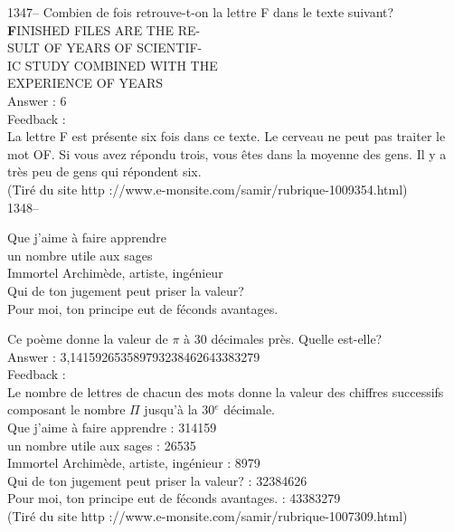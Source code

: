 ﻿\documentclass[letterpaper, 12pt]{article}
\begin{document}
1347-- Combien de fois retrouve-t-on la lettre F dans le texte suivant?\\

{\Large\textbf FINISHED FILES ARE THE RE-\\
SULT OF YEARS OF SCIENTIF-\\
IC STUDY COMBINED WITH THE \\
EXPERIENCE OF YEARS}\\


Answer : 6\\

Feedback : \\
La lettre F est pr\'esente six fois dans ce texte. Le cerveau ne
peut pas traiter le mot \og OF\fg .  Si vous avez r\'epondu trois,
vous \^etes dans la moyenne des gens.  Il y a tr\`es peu de gens qui r\'epondent six.  \\
(Tir\'e du site http ://www.e-monsite.com/samir/rubrique-1009354.html)\\

1348-- \begin{center}{Que j'aime \`a faire apprendre\\
un nombre utile aux sages\\
Immortel Archim\`ede, artiste, ing\'enieur\\
Qui de ton jugement peut priser la valeur?\\
Pour moi, ton principe eut de f\'econds avantages.\\}\end{center} Ce
po\`eme donne la valeur de $\pi$ \`a 30 d\'ecimales pr\`es. Quelle
est-elle?\\

Answer : 3,141592653589793238462643383279\\

Feedback : \\
Le nombre de lettres de chacun des mots donne la valeur des chiffres
successifs composant le nombre $\Pi$ jusqu'\`a la 30$^e$ d\'ecimale.\\

Que j'aime \`a faire apprendre : 314159\\
un nombre utile aux sages : 26535\\
Immortel Archim\`ede, artiste, ing\'enieur : 8979\\
Qui de ton jugement peut priser la valeur? : 32384626\\
Pour moi, ton principe eut de f\'econds avantages. : 43383279\\
(Tir\'e du site http ://www.e-monsite.com/samir/rubrique-1007309.html)\\
\end{document}
